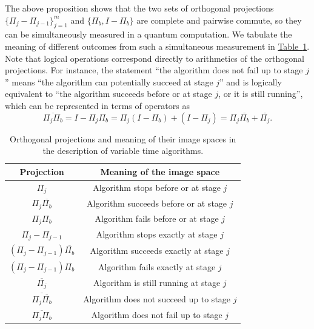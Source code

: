 \documentclass[letterpaper,onecolumn,11pt,accepted=2026-02-14]{quantumarticle}
\theoremstyle{remark}
\theoremstyle{plain}
\newcommand{\tab}[1]{\hyperref[tab:#1]{Table~\ref*{tab:#1}}}
\begin{document}
The above proposition shows that the two sets of orthogonal projections $\{\Pi_j-\Pi_{j-1}\}_{j=1}^m$ and $\{\Pi_b,I-\Pi_b\}$ are complete and pairwise commute, so they can be simultaneously measured in a quantum computation. We tabulate the meaning of different outcomes from such a simultaneous measurement in \tab{vtaa_proj}.
Note that logical operations correspond directly to arithmetics of the orthogonal projections. For instance, the statement ``the algorithm does not fail up to stage $j$'' means ``the algorithm can potentially succeed at stage $j$'' and is logically equivalent to ``the algorithm succeeds before or at stage $j$, or it is still running'', which can be represented in terms of operators as
\begin{equation}
    \overline{\Pi_j\Pi_b}
    =I-\Pi_j\Pi_b
    =\Pi_j(I-\Pi_b)+(I-\Pi_j)
    =\Pi_j\overline{\Pi_b}+\overline{\Pi_j}.
\end{equation}

\begin{table}[t]
    \centering
    \begin{tabular}{c|c}
        Projection & Meaning of the image space \\
        \hline
        $\Pi_j$ & Algorithm stops before or at stage $j$\\
        $\Pi_j\overline{\Pi_b}$ & Algorithm succeeds before or at stage $j$\\
        $\Pi_j\Pi_b$ & Algorithm fails before or at stage $j$\\
        $\Pi_j-\Pi_{j-1}$ & Algorithm stops exactly at stage $j$\\
        $\left(\Pi_j-\Pi_{j-1}\right)\overline{\Pi_b}$ & Algorithm succeeds exactly at stage $j$\\
        $\left(\Pi_j-\Pi_{j-1}\right)\Pi_b$ & Algorithm fails exactly at stage $j$\\
        $\overline{\Pi_j}$ & Algorithm is still running at stage $j$\\
        $\overline{\Pi_j\overline{\Pi_b}}$ & Algorithm does not succeed up to stage $j$\\
        $\overline{\Pi_j\Pi_b}$ & Algorithm does not fail up to stage $j$\\
    \end{tabular}
    \caption{Orthogonal projections and meaning of their image spaces in the description of variable time algorithms.}
    \label{tab:vtaa_proj}
\end{table}

\end{document}
